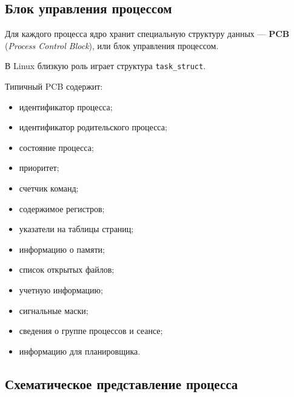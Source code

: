 \documentclass[12pt,a4paper]{article}
\begin{document}
\subsection{Блок управления процессом}

Для каждого процесса ядро хранит специальную структуру данных --- \textbf{PCB} (\textit{Process Control Block}), или блок управления процессом.

В Linux близкую роль играет структура \texttt{task\_struct}.

Типичный PCB содержит:

\begin{itemize}
    \item идентификатор процесса;
    \item идентификатор родительского процесса;
    \item состояние процесса;
    \item приоритет;
    \item счетчик команд;
    \item содержимое регистров;
    \item указатели на таблицы страниц;
    \item информацию о памяти;
    \item список открытых файлов;
    \item учетную информацию;
    \item сигнальные маски;
    \item сведения о группе процессов и сеансе;
    \item информацию для планировщика.
\end{itemize}

\subsection{Схематическое представление процесса}

\begin{center}
\end{center}
\end{document}
